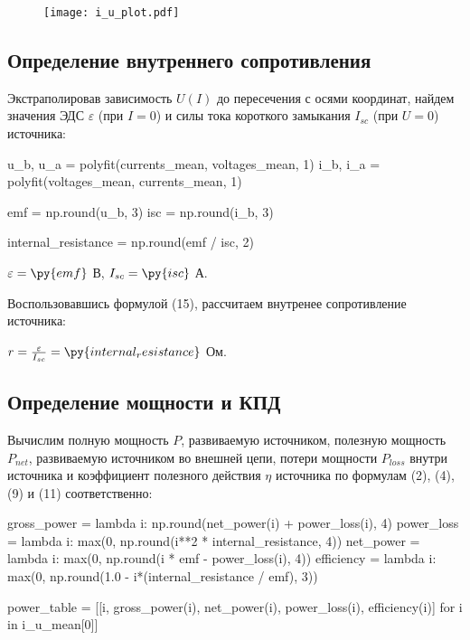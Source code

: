 \documentclass[12pt, a4paper]{article}
\begin{document}
\begin{figure}[H]
\texttt{[image: i\_u\_plot.pdf]}
\end{figure}

\subsection*{Определение внутреннего сопротивления}

Экстраполировав зависимость $U(I)$ до пересечения с осями координат,
найдем значения ЭДС $\varepsilon$ (при $I = 0$) и силы тока
короткого замыкания $I_{sc}$ (при $U = 0$) источника:

\begin{pycode}
u_b, u_a = polyfit(currents_mean, voltages_mean, 1)
i_b, i_a = polyfit(voltages_mean, currents_mean, 1)

emf = np.round(u_b, 3)
isc = np.round(i_b, 3)

internal_resistance = np.round(emf / isc, 2)
\end{pycode}

\noindent
$\varepsilon = \py{emf}$ В, $I_{sc} = \py{isc}$ А.

Воспользовавшись формулой (15), рассчитаем внутренее сопротивление источника:

\noindent
$r = \frac{\varepsilon}{I_{sc}} = \py{internal_resistance}$ Ом.

\subsection*{Определение мощности и КПД}  

Вычислим полную мощность $P$, развиваемую источником, полезную мощность $P_{net}$,
развиваемую источником во внешней цепи, потери мощности $P_{loss}$ внутри
источника и коэффициент полезного действия $\eta$ источника
по формулам (2), (4), (9) и (11) соответственно:

\begin{pycode}
gross_power = lambda i: np.round(net_power(i) + power_loss(i), 4)
power_loss = lambda i: max(0, np.round(i**2 * internal_resistance, 4))
net_power = lambda i: max(0, np.round(i * emf - power_loss(i), 4))
efficiency = lambda i: max(0, np.round(1.0 - i*(internal_resistance / emf), 3))

power_table = [[i, gross_power(i), net_power(i), power_loss(i), efficiency(i)] for i in i_u_mean[0]]
\end{pycode}

\begin{table}[H]
\end{table} 
\end{document}
